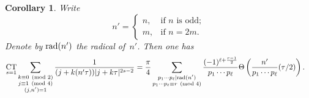 \documentclass[11pt, reqno]{amsart}
\theoremstyle{plain}
\newtheorem{corollary}[theorem]{Corollary}
\theoremstyle{definition}
\numberwithin{equation}{section}
\begin{document}
\begin{corollary}\label{eisentheta}
Write 
$$
n'=\begin{cases}
    n,&\mbox{if $n$ is odd};\\
    m,&\mbox{if $n=2m$}.
\end{cases}
$$
    Denote by ${\rm rad}(n')$ the radical of~$n'$. Then one has
    \begin{align*}
        \underset{s=1}{{\rm CT}} \sum_{\substack{k\equiv0\pmod{2}\\j\equiv1\pmod{4}\\(j,n')=1}}\frac{1}{(j+k(n'\tau))|j+k\tau|^{2s-2}}&=\frac{\pi}{4} \sum_{\substack{p_{1}\cdots p_{\ell}|{\rm rad}(n')\\ p_{1}\cdots p_{\ell}\equiv r\pmod{4}}}\frac{(-1)^{\ell+\frac{r-1}{2}}}{p_{1}\cdots p_{\ell}}\Theta\left(\frac{n'}{p_{1}\cdots p_{\ell}}(\tau/2)\right).
    \end{align*}
\end{corollary}
\end{document}

